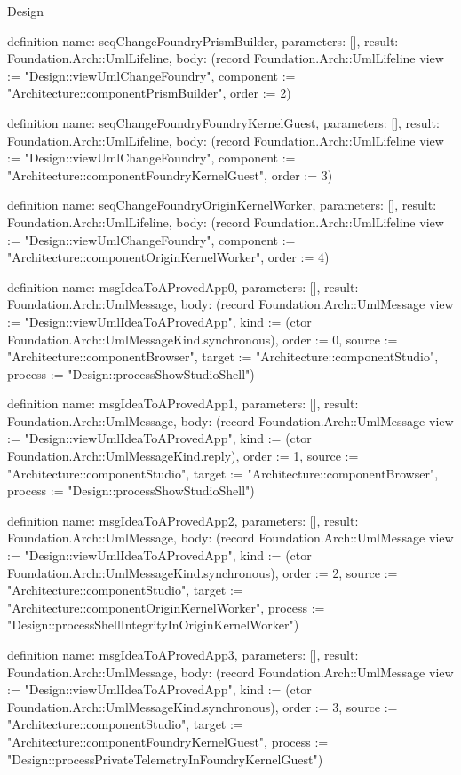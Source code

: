 \begin{lexlean}{Design}
\begin{semanticmodule}
definition{
  name: seqChangeFoundryPrismBuilder,
  parameters: [],
  result: Foundation.Arch::UmlLifeline,
  body: (record Foundation.Arch::UmlLifeline {view := "Design::viewUmlChangeFoundry", component := "Architecture::componentPrismBuilder", order := 2})
}

definition{
  name: seqChangeFoundryFoundryKernelGuest,
  parameters: [],
  result: Foundation.Arch::UmlLifeline,
  body: (record Foundation.Arch::UmlLifeline {view := "Design::viewUmlChangeFoundry", component := "Architecture::componentFoundryKernelGuest", order := 3})
}

definition{
  name: seqChangeFoundryOriginKernelWorker,
  parameters: [],
  result: Foundation.Arch::UmlLifeline,
  body: (record Foundation.Arch::UmlLifeline {view := "Design::viewUmlChangeFoundry", component := "Architecture::componentOriginKernelWorker", order := 4})
}

definition{
  name: msgIdeaToAProvedApp0,
  parameters: [],
  result: Foundation.Arch::UmlMessage,
  body: (record Foundation.Arch::UmlMessage {view := "Design::viewUmlIdeaToAProvedApp", kind := (ctor Foundation.Arch::UmlMessageKind.synchronous), order := 0, source := "Architecture::componentBrowser", target := "Architecture::componentStudio", process := "Design::processShowStudioShell"})
}

definition{
  name: msgIdeaToAProvedApp1,
  parameters: [],
  result: Foundation.Arch::UmlMessage,
  body: (record Foundation.Arch::UmlMessage {view := "Design::viewUmlIdeaToAProvedApp", kind := (ctor Foundation.Arch::UmlMessageKind.reply), order := 1, source := "Architecture::componentStudio", target := "Architecture::componentBrowser", process := "Design::processShowStudioShell"})
}

definition{
  name: msgIdeaToAProvedApp2,
  parameters: [],
  result: Foundation.Arch::UmlMessage,
  body: (record Foundation.Arch::UmlMessage {view := "Design::viewUmlIdeaToAProvedApp", kind := (ctor Foundation.Arch::UmlMessageKind.synchronous), order := 2, source := "Architecture::componentStudio", target := "Architecture::componentOriginKernelWorker", process := "Design::processShellIntegrityInOriginKernelWorker"})
}

definition{
  name: msgIdeaToAProvedApp3,
  parameters: [],
  result: Foundation.Arch::UmlMessage,
  body: (record Foundation.Arch::UmlMessage {view := "Design::viewUmlIdeaToAProvedApp", kind := (ctor Foundation.Arch::UmlMessageKind.synchronous), order := 3, source := "Architecture::componentStudio", target := "Architecture::componentFoundryKernelGuest", process := "Design::processPrivateTelemetryInFoundryKernelGuest"})
}


\end{semanticmodule}
\end{lexlean}
